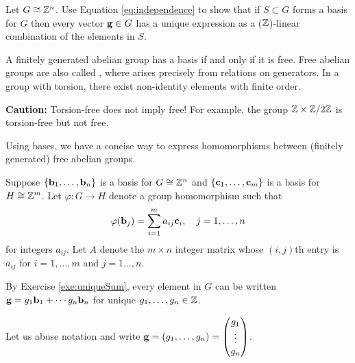 \documentclass[../algebraNotesMSRI-UP2016.tex]{subfiles}
\begin{document}
\begin{frame}
\begin{exe}\label{exe:uniqueSum}
Let $G\cong \mathbb Z^n$.  Use Equation \eqref{eq:independence} to show that if $S\subset G$ forms a basis for $G$ then every vector $\mathbf g\in G$ has a unique expression as a ($\mathbb Z$)-linear combination of the elements in $S$.
\end{exe}

\smallGap
A finitely generated abelian group has a basis if and only if it is free.  Free abelian groups are also called , where  arises precisely from relations on generators.  In a group with torsion, there exist non-identity elements with finite order.  

\smallGap
\textbf{Caution:} Torsion-free does not imply free!  For example, the group $\mathbb Z\times \mathbb Z/2\mathbb Z$ is torsion-free but not free. 

\smallGap
Using bases, we have a concise way to express homomorphisms between (finitely generated) free abelian groups. 
\end{frame}

\begin{frame}
Suppose $\{\mathbf b_1,\dots,\mathbf b_n\}$ is a basis for $G\cong \mathbb Z^n$ and $\{\mathbf c_1,\dots,\mathbf c_m\}$ is a basis for $H\cong \mathbb Z^m$.  Let $\varphi:G\to H$ denote a group homomorphism such that  
\[
\varphi{(\mathbf b_j)}=\sum_{i=1}^ma_{ij}\mathbf c_i,\quad j=1,\dots,n
\]
for integers $a_{ij}$.  Let $A$ denote the $m\times n$ integer matrix whose $(i,j)$th entry is $a_{ij}$ for $i=1,\dots,m$ and $j=1\dots, n$.

\smallGap
By Exercise \ref{exe:uniqueSum}, every element in $G$ can be written $\mathbf g=g_1\mathbf b_1+\cdots g_n\mathbf b_n$ for unique $g_1,\dots, g_n\in \mathbb Z$.  

\vspace{-0.5pc}
Let us abuse notation and write 
$\mathbf g=(g_1,\dots,g_n)
	=\begin{pmatrix}
	g_1 \\
	\vdots \\
	g_n
	\end{pmatrix}
$.
\end{frame}
\end{document}
